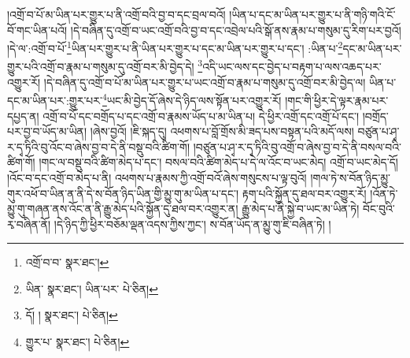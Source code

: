 །འགྲོ་བ་པོ་མ་ཡིན་པར་གྱུར་པ་ནི་འགྲོ་བའི་བྱ་བ་དང་བྲལ་བའོ། །ཡིན་པ་དང་མ་ཡིན་པར་གྱུར་པ་ནི་གཉི་གའི་ངོ་བོ་གང་ཡིན་པའོ། །དེ་བཞིན་དུ་འགྲོ་བ་ཡང་འགྲོ་བའི་བྱ་བ་དང་འབྲེལ་པའི་སྒོ་ནས་རྣམ་པ་གསུམ་དུ་རིག་པར་བྱའོ། །དེ་ལ་:འགྲོ་བ་པོ་\footnote{འགྲོ་བ་བ་  སྣར་ཐང་། }ཡིན་པར་གྱུར་པ་ནི་ཡིན་པར་གྱུར་པ་དང་མ་ཡིན་པར་གྱུར་པ་དང་། :ཡིན་པ་\footnote{ཡིན་  སྣར་ཐང་། ཡིན་པར་  པེ་ཅིན། }དང་མ་ཡིན་པར་གྱུར་པའི་འགྲོ་བ་རྣམ་པ་གསུམ་དུ་འགྲོ་བར་མི་བྱེད་དེ། \footnote{དོ། །   སྣར་ཐང་།  པེ་ཅིན། }འདི་ཡང་ལས་དང་བྱེད་པ་བརྟག་པ་ལས་འཆད་པར་འགྱུར་རོ། །དེ་བཞིན་དུ་འགྲོ་བ་པོ་མ་ཡིན་པར་གྱུར་པ་ཡང་འགྲོ་བ་རྣམ་པ་གསུམ་དུ་འགྲོ་བར་མི་བྱེད་ལ། ཡིན་པ་དང་མ་ཡིན་པར་:གྱུར་པར་\footnote{གྱུར་པ་  སྣར་ཐང་།  པེ་ཅིན། }ཡང་མི་བྱེད་དོ་ཞེས་དེ་ཉིད་ལས་སྟོན་པར་འགྱུར་རོ། །གང་གི་ཕྱིར་དེ་ལྟར་རྣམ་པར་དཔྱད་ན། འགྲོ་བ་པོ་དང་བགྲོད་པ་དང་འགྲོ་བ་རྣམས་ཡོད་པ་མ་ཡིན་པ། དེ་ཕྱིར་འགྲོ་དང་འགྲོ་པོ་དང་། །བགྲོད་པར་བྱ་བ་ཡོད་མ་ཡིན། །ཞེས་བྱའོ། །ཇི་སྐད་དུ། འཕགས་པ་བློ་གྲོས་མི་ཟད་པས་བསྟན་པའི་མདོ་ལས། བཙུན་པ་ཤྭ་ར་དྭ་ཏིའི་བུ་འོང་བ་ཞེས་བྱ་བ་དེ་ནི་བསྡུ་བའི་ཚིག་གོ། །བཙུན་པ་ཤྭ་ར་དྭ་ཏིའི་བུ་འགྲོ་བ་ཞེས་བྱ་བ་དེ་ནི་བསལ་བའི་ཚིག་གོ། །གང་ལ་བསྡུ་བའི་ཚིག་མེད་པ་དང་། བསལ་བའི་ཚིག་མེད་པ་དེ་ལ་འོང་བ་ཡང་མེད། འགྲོ་བ་ཡང་མེད་དོ། །འོང་བ་དང་འགྲོ་བ་མེད་པ་ནི། འཕགས་པ་རྣམས་ཀྱི་འགྲོ་བའོ་ཞེས་གསུངས་པ་ལྟ་བུའོ། །གལ་ཏེ་ས་བོན་ཉིད་མྱུ་གུར་འཕོ་བ་ཡིན་ན་ནི་དེ་ས་བོན་ཉིད་ཡིན་གྱི་མྱུ་གུ་མ་ཡིན་པ་དང་། རྟག་པའི་སྐྱོན་དུ་ཐལ་བར་འགྱུར་རོ། །འོན་ཏེ་མྱུ་གུ་གཞན་ནས་འོང་ན་ནི་རྒྱུ་མེད་པའི་སྐྱོན་དུ་ཐལ་བར་འགྱུར་ན། རྒྱུ་མེད་པ་ནི་སྐྱེ་བ་ཡང་མ་ཡིན་ཏེ། བོང་བུའི་རྭ་བཞིན་ནོ། །དེ་ཉིད་ཀྱི་ཕྱིར་བཅོམ་ལྡན་འདས་ཀྱིས་ཀྱང་། ས་བོན་ཡོད་ན་མྱུ་གུ་ཇི་བཞིན་ཏེ། །
